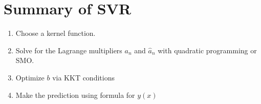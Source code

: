 \documentclass{tufte-handout}
\begin{document}
\section{Summary of SVR}
	\begin{enumerate}
		\item Choose a kernel function.
		\item Solve for the Lagrange multipliers $a_{n}$ and $\hat{a}_{n}$ with quadratic programming or SMO.
		\item Optimize $b$ via KKT conditions
		\item Make the prediction using formula for $y(x)$
	\end{enumerate}
\end{document}

